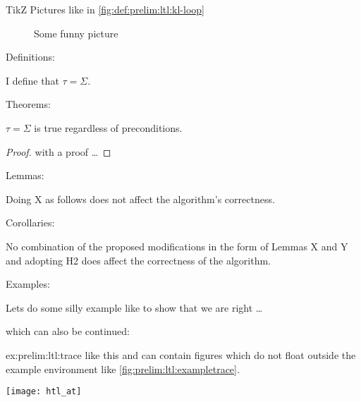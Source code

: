 TikZ Pictures like in \autoref{fig:def:prelim:ltl:kl-loop}
\begin{figure}
  \centering
  \caption{Some funny picture}
  \label{fig:def:prelim:ltl:kl-loop}
\end{figure}

Definitions:
\begin{definition}[Trace]\label{def:prelim:ltl:trace}
  I define that  $\tau = \Sigma$.
\end{definition}

Theorems:
\begin{theorem} \label{thm:enc:enc:basic}
	$\tau = \Sigma$ is true regardless of preconditions. 
\end{theorem}
\begin{proof}
with a proof \ldots 
\end{proof}

Lemmas:
\begin{lemma}
Doing X as follows does not affect the algorithm's correctness. 
\end{lemma}

Corollaries:
\begin{corollary} 
	No combination of the proposed modifications in the form of Lemmas X and Y and adopting H2 does affect the correctness of the algorithm.
\end{corollary}


Examples:

\begin{example} \label{ex:prelim:ltl:trace}
Lets do some silly example like to show that we are right \ldots
\end{example}

which can also be continued:

\begin{examplecont}{ex:prelim:ltl:trace}
	 like this and can contain figures which do not float outside the example 
	 environment like \autoref{fig:prelim:ltl:exampletrace}.

	 \begin{fakefigure}
	  \vspace*{-1em}
		\centering
		\captionsetup{type=figure}
		\texttt{[image: htl\_at]}
		\label{fig:prelim:ltl:exampletrace}
	\end{fakefigure}
\end{examplecont}

